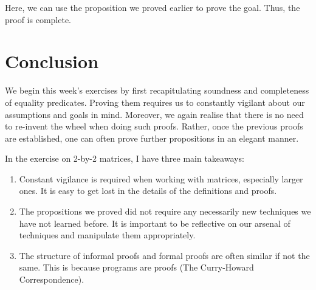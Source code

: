 \documentclass{article}
\begin{document}
Here, we can use the proposition we proved earlier to prove the goal. Thus, the proof is complete.

\section{Conclusion}
We begin this week's exercises by first recapitulating soundness and completeness of equality predicates. Proving them requires us to constantly vigilant about our assumptions and goals in mind. Moreover, we again realise that there is no need to re-invent the wheel when doing such proofs. Rather, once the previous proofs are established, one can often prove further propositions in an elegant manner. 

In the exercise on 2-by-2 matrices, I have three main takeaways:
\begin{enumerate}
  \item Constant vigilance is required when working with matrices, especially larger ones. It is easy to get lost in the details of the definitions and proofs.
  \item The propositions we proved did not require any necessarily new techniques we have not learned before. It is important to be reflective on our arsenal of techniques and manipulate them appropriately.
  \item The structure of informal proofs and formal proofs are often similar if not the same. This is because programs are proofs (The Curry-Howard Correspondence).
\end{enumerate}
\end{document}

